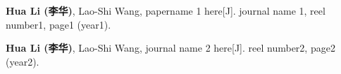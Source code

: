 
\begin{publications}
    \item {\bf Hua Li (李华)}, Lao-Shi Wang, papername 1 here[J]. journal name 1, reel number1, page1 (year1).
    \item {\bf Hua Li (李华)}, Lao-Shi Wang, journal name 2 here[J]. reel number2, page2 (year2).
\end{publications}

